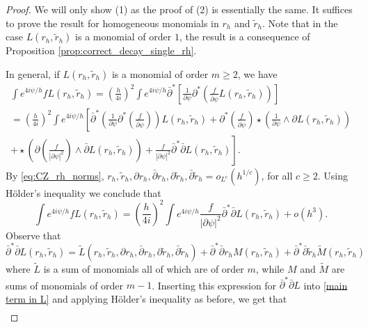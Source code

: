 \documentclass[12pt]{amsart}
\theoremstyle{definition}
\theoremstyle{remark}
\begin{document}
{\begin{proof}
{\color{black}
We will only show (1) as the proof of (2) is essentially the same. It suffices to prove the result for homogeneous monomials in $r_h$ and $\tilde r_h$. 
Note that in the case $L(r_h,\tilde r_h)$ is a monomial of order $1$, the result is a consequence of Proposition \ref{prop:correct_decay_single_rh}. 

In general, if $L(r_h,\tilde r_h)$ is a monomial of order $m\geq 2$, we have
\begin{multline*}
\int e^{4i\psi/h}f L(r_h,\tilde r_h)
=\left(\frac{h}{4i}\right)^2\int e^{4i\psi/h}\bar\partial^*\left[\frac{1}{\partial\psi}\partial^*\left(\frac{f}{\bar\partial\psi}L(r_h,\tilde r_h)\right)\right]\\
=\left(\frac{h}{4i}\right)^2\int e^{4i\psi/h}\left[ \bar\partial^*\left(\frac{1}{\partial\psi}\partial^*\left(\frac{f}{\bar\partial\psi}\right)\right)L(r_h,\tilde r_h)
+\partial^*\left(\frac{f}{\bar\partial\psi}\right)\star\left(\frac{1}{\partial\psi}\wedge\partial L(r_h,\tilde r_h)\right)\right.\\\left.
+\star\left(\partial\left(\frac{f}{|\partial\psi|^2}\right)\wedge\bar\partial L(r_h,\tilde r_h)\right)
+\frac{f}{|\partial\psi|^2}\bar\partial^*\bar\partial L(r_h,\tilde r_h)\right].
\end{multline*}
By \eqref{eq:CZ_rh_norms},
{\color{black}$
r_h,\tilde r_h, \partial r_h, \bar\partial r_h, \partial \tilde r_h, \bar\partial \tilde r_h=o_{L^c}(h^{1/c})$, for all $c\geq 2$.}
Using H\"older's inequality we conclude that
\begin{equation}
\label{main term in L}
\int e^{4i\psi/h}f L(r_h,\tilde r_h)
=\left(\frac{h}{4i}\right)^2\int e^{4i\psi/h}\frac{f}{|\partial\psi|^2}\bar\partial^*\bar\partial L(r_h,\tilde r_h)+o(h^3).
\end{equation}
Observe that
$$\bar\partial^*\bar\partial L(r_h,\tilde r_h) =  \tilde L( r_h,\tilde r_h, \partial r_h, \bar\partial r_h, \partial \tilde r_h, \bar\partial \tilde r_h) + \bar\partial^*\bar\partial r_h M(r_h, \tilde r_h) + \bar\partial^*\bar\partial \tilde r_h \widetilde M(r_h, \tilde r_h)$$
where $\tilde L$ is a sum of monomials all of which are of order $m$, while $M$ and $\widetilde M$ are sums of monomials of order $m-1$. Inserting this expression for $\bar\partial^*\bar\partial L$ into \eqref{main term in L} and applying H\"older's inequality as before, we get that 
\begin{eqnarray}

\end{eqnarray}}
\end{proof}}
\end{document}
